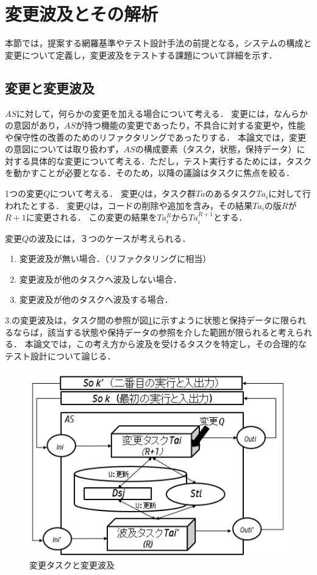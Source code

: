 \newpage
\section{変更波及とその解析}
本節では，提案する網羅基準やテスト設計手法の前提となる，システムの構成と変更について定義し，変更波及をテストする課題について詳細を示す．

\subsection{変更と変更波及}
$AS$に対して，何らかの変更を加える場合について考える．
変更には，なんらかの意図があり，$AS$が持つ機能の変更であったり，不具合に対する変更や，性能や保守性の改善のためのリファクタリングであったりする．
本論文では，変更の意図については取り扱わず，$AS$の構成要素（タスク，状態，保持データ）に対する具体的な変更について考える．ただし，テスト実行するためには，タスクを動かすことが必要となる．そのため，以降の議論はタスクに焦点を絞る．%

1つの変更$Q$について考える．
変更$Q$は，タスク群$Ta$のあるタスク$Ta_i$に対して行われたとする．
変更$Q$は，コードの削除や追加を含み，その結果$Ta_i$の版$R$が$R+1$に変更される．
この変更の結果を$Ta^{R}_i$から$Ta^{R+1}_i$とする．

変更$Q$の波及には，３つのケースが考えられる．
\begin{enumerate}
  \item 変更波及が無い場合．（リファクタリングに相当）
  \item 変更波及が他のタスクへ波及しない場合．%
  \item 変更波及が他のタスクへ波及する場合．
\end{enumerate}

3.の変更波及は，タスク間の参照が図\ref{fig:fig-2}に示すように状態と保持データに限られるならば，該当する状態や保持データの参照を介した範囲が限られると考えられる．
本論文では，この考え方から波及を受けるタスクを特定し，その合理的なテスト設計について論じる．



\begin{figure}[b]
\begin{center}
\includegraphics[scale=0.5]{./image/fig-2.png}
\end{center}
\caption{変更タスクと変更波及}
\label{fig:fig-2}
\end{figure}

